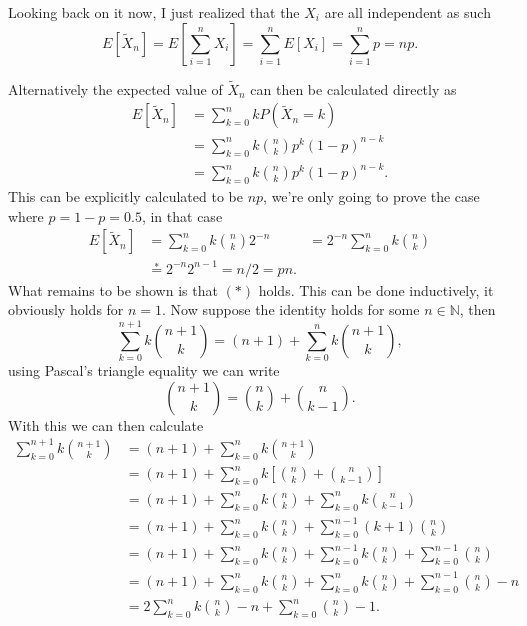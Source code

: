 \documentclass{article}
\begin{document}
\begin{enumerate}
\begin{itemize}
			Looking back on it now, I just realized that the $X_i$ are all independent as such
			$$
			E[\tilde{X}_n] = E\left[\sum_{i = 1}^n X_i\right] = \sum_{i = 1}^n E[X_i] = \sum_{i = 1}^n p = np.
			$$

			Alternatively the expected value of $\tilde{X}_n$ can then be calculated directly as
			$$
			\begin{aligned}
			E[\tilde{X}_n] &= \sum_{k = 0}^n kP(\tilde{X}_n = k) \\
			&= \sum_{k = 0}^n k \binom{n}{k} p^k (1 - p)^{n - k} \\
			&= \sum_{k = 0}^n k \binom{n}{k} p^k (1 - p)^{n - k}.
			\end{aligned}
			$$
			This can be explicitly calculated to be $np$, we're only going to prove the case where $p = 1 - p = 0.5$, in that case
			$$
			\begin{aligned}
			E[\tilde{X}_n] &= \sum_{k = 0}^n k \binom{n}{k} 2^{-n}
			&= 2^{-n} \sum_{k = 0}^n k \binom{n}{k} \\
			&\overset{*}{=} 2^{-n} 2^{n - 1} = n / 2 = pn.
			\end{aligned}
			$$
			What remains to be shown is that $(*)$ holds. This can be done inductively, it obviously holds for $n = 1$. Now suppose the identity holds for some $n \in \mathbb{N}$, then
			$$
			\sum_{k = 0}^{n + 1} k \binom{n + 1}{k} = (n + 1) + \sum_{k = 0}^n k \binom{n + 1}{k},
			$$
			using Pascal's triangle equality we can write
			$$
			\binom{n + 1}{k} = \binom{n}{k} + \binom{n}{k - 1}.
			$$
			With this we can then calculate
			$$
			\begin{aligned}
			\sum_{k = 0}^{n + 1} k \binom{n + 1}{k} &= (n + 1) + \sum_{k = 0}^n k \binom{n + 1}{k} \\
			&= (n + 1) + \sum_{k = 0}^n k \left[ \binom{n}{k} + \binom{n}{k - 1} \right] \\
			&= (n + 1) + \sum_{k = 0}^n k \binom{n}{k} + \sum_{k = 0}^n k \binom{n}{k - 1} \\
			&= (n + 1) + \sum_{k = 0}^n k \binom{n}{k} + \sum_{k = 0}^{n - 1} (k + 1) \binom{n}{k} \\
			&= (n + 1) + \sum_{k = 0}^n k \binom{n}{k} + \sum_{k = 0}^{n - 1} k \binom{n}{k} + \sum_{k = 0}^{n - 1} \binom{n}{k} \\
			&= (n + 1) + \sum_{k = 0}^n k \binom{n}{k} + \sum_{k = 0}^n k \binom{n}{k} + \sum_{k = 0}^{n - 1} \binom{n}{k} - n \\
			&= 2 \sum_{k = 0}^n k \binom{n}{k} - n + \sum_{k = 0}^n \binom{n}{k} - 1.
			\end{aligned}
$$
\end{itemize}
\end{enumerate}
\end{document}
